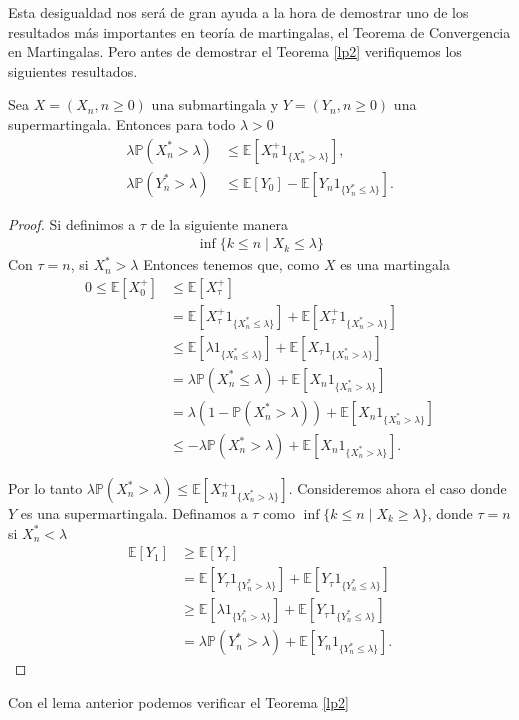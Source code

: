 Esta desigualdad nos será de gran ayuda a la hora de demostrar uno de los resultados más importantes en teoría de martingalas, el Teorema de Convergencia en Martingalas. Pero antes de demostrar el Teorema \ref{lp2} verifiquemos los siguientes resultados.

\begin{lemma}
\label{lemdes2}
Sea $X = (X_n, n \geq 0)$ una submartingala y $Y = (Y_n, n \geq 0)$ una supermartingala. Entonces para todo $\lambda > 0$
	\begin{align}
		\lambda  \mathbb{P}(X_n^{*} > \lambda) & \leq \mathbb{E}[X_n^{+} 1_{\{X_n^{*} > \lambda\}}] \label{aaj}, \\
		\lambda  \mathbb{P}(Y_n^{*} > \lambda) & \leq \mathbb{E}[Y_0] - \mathbb{E}[Y_n 1_{\{Y_n^{*} \leq \lambda\}}]. \label{aak}
	\end{align}
\end{lemma}
\begin{proof}
Si definimos a $\tau$ de la siguiente manera
	\begin{align*}
	\inf \{k \leq n \mid X_k \leq \lambda\}
	\end{align*}
Con $\tau = n$, si $X_n^{*} > \lambda$
Entonces tenemos que, como $X$ es una martingala
	\begin{align*}
	0 \leq \mathbb{E}[X_0^{+}] & \leq \mathbb{E}[X_{\tau}^{+}] \\
	& = \mathbb{E}[X_{\tau}^{+} 1_{\{X_n^{*} \leq \lambda\}}] + \mathbb{E}[X_{\tau}^{+} 1_{\{X_n^{*} > \lambda\}}] \\
	& \leq \mathbb{E}[\lambda  1_{\{X_n^{*} \leq \lambda\}}] + \mathbb{E}[X_{\tau} 1_{\{X_n^{*} > \lambda\}}] \\
	& = \lambda  \mathbb{P}(X_n^{*} \leq \lambda) + \mathbb{E}[X_n 1_{\{X_n^{*} > \lambda\}}] \\
	& = \lambda  (1 - \mathbb{P}(X_n^{*} > \lambda)) + \mathbb{E}[X_n 1_{\{X_n^{*} > \lambda\}}] \\
	& \leq - \lambda \mathbb{P}(X_n^{*} > \lambda) + \mathbb{E}[X_n 1_{\{X_n^{*} > \lambda\}}].
	\end{align*}

Por lo tanto $\lambda  \mathbb{P}(X_n^{*} > \lambda) \leq \mathbb{E}[X_n^{+} 1_{\{X_n^{*} > \lambda\}}]$. Consideremos ahora el caso donde $Y$ es una supermartingala. Definamos a $\tau$ como $\inf \{k \leq n \mid X_k \geq \lambda\}$, donde $\tau = n$ si $X_n^{*} < \lambda$
	\begin{align*}
	\mathbb{E}[Y_1] & \geq \mathbb{E}[Y_{\tau}] \\
	& = \mathbb{E}[Y_{\tau} 1_{\{Y_n^{*} > \lambda\}}] + \mathbb{E}[Y_{\tau} 1_{\{Y_n^{*} \leq \lambda\}}] \\
	& \geq \mathbb{E}[\lambda  1_{\{Y_n^{*} > \lambda\}}] + \mathbb{E}[Y_{\tau} 1_{\{Y_n^{*} \leq \lambda\}}] \\
	& = \lambda  \mathbb{P}(Y_n^{*} > \lambda) + \mathbb{E}[Y_n 1_{\{Y_n^{*} \leq \lambda\}}].
	\end{align*}
\end{proof}
Con el lema anterior podemos verificar el Teorema \ref{lp2}

